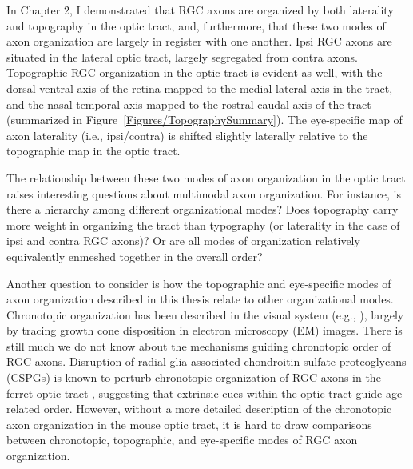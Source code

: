 In Chapter 2, I demonstrated that RGC axons are organized by both laterality and topography in the optic tract, and, furthermore, that these two modes of axon organization are largely in register with one another.
Ipsi RGC axons are situated in the lateral optic tract, largely segregated from contra axons.
Topographic RGC organization in the optic tract is evident as well, with the dorsal-ventral axis of the retina mapped to the medial-lateral axis in the tract, and the nasal-temporal axis mapped to the rostral-caudal axis of the tract (summarized in Figure~\ref{Figures/TopographySummary}).
The eye-specific map of axon laterality (i.e., ipsi/contra) is shifted slightly laterally relative to the topographic map in the optic tract.

The relationship between these two modes of axon organization in the optic tract raises interesting questions about multimodal axon organization.
For instance, is there a hierarchy among different organizational modes?
Does topography carry more weight in organizing the tract than typography (or laterality in the case of ipsi and contra RGC axons)?
Or are all modes of organization relatively equivalently enmeshed together in the overall order?

Another question to consider is how the topographic and eye-specific modes of axon organization described in this thesis relate to other organizational modes.
Chronotopic organization has been described in the visual system (e.g., ), largely by tracing growth cone disposition in electron microscopy (EM) images.
There is still much we do not know about the mechanisms guiding chronotopic order of RGC axons.
Disruption of radial glia-associated chondroitin sulfate proteoglycans (CSPGs) is known to perturb chronotopic organization of RGC axons in the ferret optic tract \cite{reese1997chronotopic,leung2003enzymatic}, suggesting that extrinsic cues within the optic tract guide age-related order.
However, without a more detailed description of the chronotopic axon organization in the mouse optic tract, it is hard to draw comparisons between chronotopic, topographic, and eye-specific modes of RGC axon organization.

